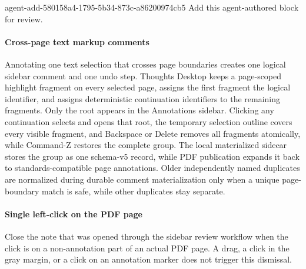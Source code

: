 \agentProposedEdit
  {agent-add-580158a4-1795-5b34-873c-a86200974cb5}
  {Add this agent-authored block for review.}
  {}
  {\paragraph{Cross-page text markup comments}
Annotating one text selection that crosses page boundaries creates one logical sidebar comment and one undo step.
Thoughts Desktop keeps a page-scoped highlight fragment on every selected page, assigns the first fragment the logical identifier, and assigns deterministic continuation identifiers to the remaining fragments.
Only the root appears in the Annotations sidebar.
Clicking any continuation selects and opens that root, the temporary selection outline covers every visible fragment, and Backspace or Delete removes all fragments atomically, while Command-Z restores the complete group.
The local materialized sidecar stores the group as one schema-v5 record, while PDF publication expands it back to standards-compatible page annotations.
Older independently named duplicates are normalized during durable comment materialization only when a unique page-boundary match is safe, while other duplicates stay separate.}

\paragraph{Single left-click on the PDF page}
Close the note that was opened through the sidebar review workflow when the click is on a non-annotation part of an actual PDF page.
A drag, a click in the gray margin, or a click on an annotation marker does not trigger this dismissal.

